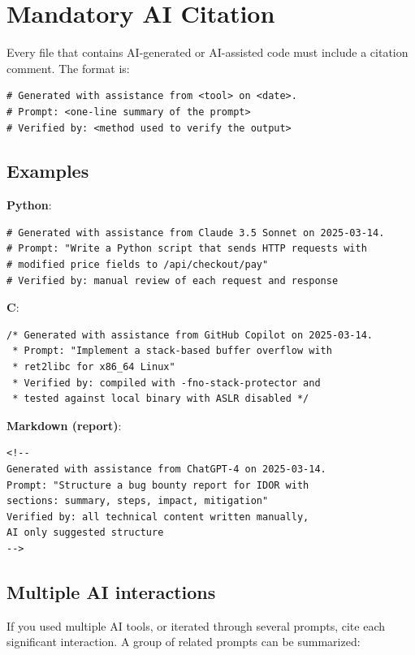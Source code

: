\section{Mandatory AI Citation}
\label{sec:ai-citation}

Every file that contains AI-generated or AI-assisted code must
include a citation comment. The format is:

\begin{verbatim}
# Generated with assistance from <tool> on <date>.
# Prompt: <one-line summary of the prompt>
# Verified by: <method used to verify the output>
\end{verbatim}

\subsection*{Examples}

\textbf{Python}:
\begin{verbatim}
# Generated with assistance from Claude 3.5 Sonnet on 2025-03-14.
# Prompt: "Write a Python script that sends HTTP requests with
# modified price fields to /api/checkout/pay"
# Verified by: manual review of each request and response
\end{verbatim}

\textbf{C}:
\begin{verbatim}
/* Generated with assistance from GitHub Copilot on 2025-03-14.
 * Prompt: "Implement a stack-based buffer overflow with
 * ret2libc for x86_64 Linux"
 * Verified by: compiled with -fno-stack-protector and
 * tested against local binary with ASLR disabled */
\end{verbatim}

\textbf{Markdown (report)}:
\begin{verbatim}
<!--
Generated with assistance from ChatGPT-4 on 2025-03-14.
Prompt: "Structure a bug bounty report for IDOR with
sections: summary, steps, impact, mitigation"
Verified by: all technical content written manually,
AI only suggested structure
-->
\end{verbatim}

\subsection*{Multiple AI interactions}

If you used multiple AI tools, or iterated through several prompts,
cite each significant interaction. A group of related prompts can
be summarized:

